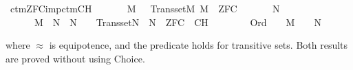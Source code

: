 \begin{isabelle}
\isamarkupfalse%
\ ctm{\isacharunderscore}{\kern0pt}ZFC{\isacharunderscore}{\kern0pt}imp{\isacharunderscore}{\kern0pt}ctm{\isacharunderscore}{\kern0pt}CH{\isacharcolon}{\kern0pt}\isanewline
\ \ \isanewline
\ \ \ \ {\isachardoublequoteopen}M\ {\isasymapprox}\ {\isasymomega}{\isachardoublequoteclose}\ {\isachardoublequoteopen}Transset{\isacharparenleft}{\kern0pt}M{\isacharparenright}{\kern0pt}{\isachardoublequoteclose}\ {\isachardoublequoteopen}M\ {\isasymTurnstile}\ ZFC{\isachardoublequoteclose}\isanewline
\ \ \isanewline
\ \ \ \ {\isachardoublequoteopen}{\isasymexists}N{\isachardot}{\kern0pt}\isanewline
\ \ \ \ \ \ M\ {\isasymsubseteq}\ N\ {\isasymand}\ N\ {\isasymapprox}\ {\isasymomega}\ {\isasymand}\ Transset{\isacharparenleft}{\kern0pt}N{\isacharparenright}{\kern0pt}\ {\isasymand}\ N\ {\isasymTurnstile}\ ZFC\ {\isasymunion}\ {\isacharbraceleft}{\kern0pt}{\isasymcdot}CH{\isasymcdot}{\isacharbraceright}{\kern0pt}\ {\isasymand}\isanewline
\ \ \ \ \ \ {\isacharparenleft}{\kern0pt}{\isasymforall}{\isasymalpha}{\isachardot}{\kern0pt}\ Ord{\isacharparenleft}{\kern0pt}{\isasymalpha}{\isacharparenright}{\kern0pt}\ {\isasymlongrightarrow}\ {\isacharparenleft}{\kern0pt}{\isasymalpha}\ {\isasymin}\ M\ {\isasymlongleftrightarrow}\ {\isasymalpha}\ {\isasymin}\ N{\isacharparenright}{\kern0pt}{\isacharparenright}{\kern0pt}{\isachardoublequoteclose}
\end{isabelle}
where $\approx$ is equipotence, and the predicate 
holds for
transitive sets. Both results are proved without using Choice.

